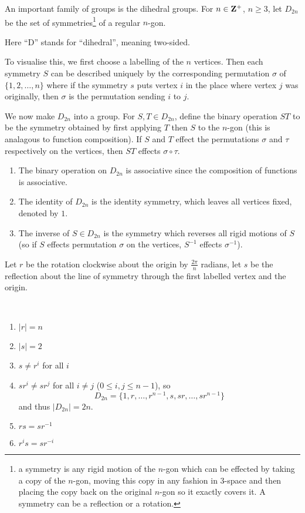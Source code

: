 \begin{example}
An important family of groups is the dihedral groups. For $n\in\mathbf Z^+$, $n\ge3$, let $D_{2n}$ be the set of symmetries\footnote{a symmetry is any rigid motion of the $n$-gon which can be effected by taking a copy of the $n$-gon, moving this copy in any fashion in $3$-space and then placing the copy back on the original $n$-gon so it exactly covers it. A symmetry can be a reflection or a rotation.} of a regular $n$-gon.

\begin{remark}
Here ``D'' stands for ``dihedral'', meaning two-sided.
\end{remark}

To visualise this, we first choose a labelling of the $n$ vertices. Then each symmetry $S$ can be described uniquely by the corresponding permutation $\sigma$ of $\{1,2,\dots,n\}$ where if the symmetry $s$ puts vertex $i$ in the place where vertex $j$ was originally, then $\sigma$ is the permutation sending $i$ to $j$.

We now make $D_{2n}$ into a group. For $S,T\in D_{2n}$, define the binary operation $ST$ to be the symmetry obtained by first applying $T$ then $S$ to the $n$-gon (this is analagous to function composition). If $S$ and $T$ effect the permutations $\sigma$ and $\tau$ respectively on the vertices, then $ST$ effects $\sigma\circ\tau$.

\begin{enumerate}[label=(\roman*)]
\item The binary operation on $D_{2n}$ is associative since the composition of functions is associative.
\item The identity of $D_{2n}$ is the identity symmetry, which leaves all vertices fixed, denoted by $1$.
\item The inverse of $S\in D_{2n}$ is the symmetry which reverses all rigid motions of $S$ (so if $S$ effects permutation $\sigma$ on the vertices, $S^{-1}$ effects $\sigma^{-1}$).
\end{enumerate}

Let $r$ be the rotation clockwise about the origin by $\frac{2\pi}{n}$ radians, let $s$ be the reflection about the line of symmetry through the first labelled vertex and the origin.

\begin{proposition} \
\begin{enumerate}[label=(\arabic*)]
\item $|r|=n$
\item $|s|=2$
\item $s\neq r^i$ for all $i$
\item $sr^i\neq sr^j$ for all $i\neq j$ ($0\le i,j\le n-1$), so
\[D_{2n}=\{1,r,\dots,r^{n-1},s,sr,\dots,sr^{n-1}\}\]
and thus $|D_{2n}|=2n$.
\item $rs=sr^{-1}$
\item $r^is=sr^{-i}$
\end{enumerate}
\end{proposition}


\end{example}
